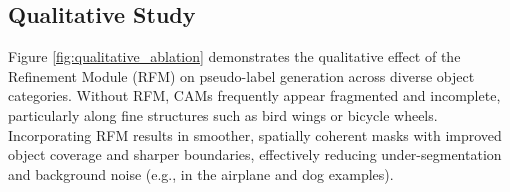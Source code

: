 \subsection{Qualitative Study}

Figure \ref{fig:qualitative_ablation} demonstrates the qualitative effect of the Refinement Module (RFM) on pseudo-label generation across diverse object categories. Without RFM, CAMs frequently appear fragmented and incomplete, particularly along fine structures such as bird wings or bicycle wheels. Incorporating RFM results in smoother, spatially coherent masks with improved object coverage and sharper boundaries, effectively reducing under-segmentation and background noise (e.g., in the airplane and dog examples). 

\begin{figure}[thbp]
  \centering
  \setlength{\tabcolsep}{0.5pt} %
  \renewcommand{\arraystretch}{0.4}
\end{figure}
